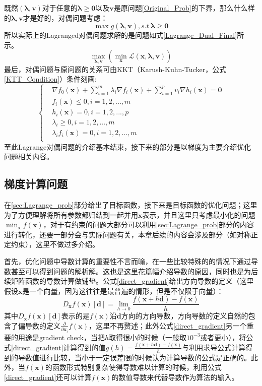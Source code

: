 既然$(\bm{\lambda},\bm{v})$对于任意的$\bm{\lambda} \geq \bm{0}$以及$\bm{v}$是原问题\ref{Original_Prob}的下界，那么什么样的$\bm{\lambda},\bm{v}$才是好的，对偶问题考虑：
\begin{equation}
\label{Dual_Prob}
\max g(\bm{\lambda},\bm{v}),s.t~\bm{\lambda} \geq \bm{0}
\end{equation}
所以实际上的Lagranged对偶问题求解的是问题如式\ref{Lagrange_Dual_Final}所示。
\begin{equation}
\label{Lagrange_Dual_Final}
\max_{\bm{\lambda},\bm{v}}\left(\min_{\bm{x}}\mathcal{L}(\bm{x},\bm{\lambda},\bm{v})\right)
\end{equation}
最后，对偶问题与原问题的关系可由KKT（Karush-Kuhn-Tucker，公式\ref{KTT_Condition}）条件刻画:
\begin{equation}
\label{KTT_Condition}
\left\{
\begin{aligned}
&\nabla f_0(\bm{x})+\sum_{i=1}^{m}\lambda_i \nabla f_i(\bm{x})+\sum_{i=1}^{p}v_i \nabla h_i(\bm{x})=\bm{0}\\
&f_i(\bm{x}) \leq 0,i=1,2,...,m\\
&h_i(\bm{x}) =0,i=1,2,...,p\\
&\lambda_i \geq 0,i=1,2,...,m\\
&\lambda_i f_i(\bm{x})=0, i=1,2,...,m\\
\end{aligned}
\right.
\end{equation}
至此Lagrange对偶问题的介绍基本结束，接下来的部分是以梯度为主要介绍优化问题相关内容。
\subsection{梯度计算问题}
\label{sec:gradinet}
在\ref{sec:Lagrange_prob}部分给出了目标函数，接下来是目标函数的优化问题；这里为了方便理解将所有参数都归结到一起并用$\bm{x}$表示，并且这里只考虑最小化的问题$\min_{\bm{x}} f(\bm{x})$，对于有约束的问题大部分可以利用\ref{sec:Lagrange_prob}部分的内容进行转化，还要一部分会与实际问题有关，本章后续的内容会涉及部分（如对称正定约束），这里不做过多介绍。

首先，优化问题中导数计算的重要性不言而喻，在一些比较特殊的的情况下通过导数甚至可以得到问题的解析解。这也是这里花篇幅介绍导数的原因，同时也是为后续矩阵函数的导数计算做铺垫。公式\ref{direct_gradient}给出方向导数的定义（这里假设$\bm{x}$是一个向量，因为这往往是最普遍的情形，但是不仅限于向量）：
\begin{equation}
\label{direct_gradient}
D_{\bm{x}}f(\bm{x})[\bm{d}]=\lim_{h\rightarrow 0}\frac{f(\bm{x}+h\bm{d})-f(\bm{x})}{h}
\end{equation}
其中$D_{\bm{x}}f(\bm{x})[\bm{d}]$表示的是$f(\bm{x})$沿$\bm{d}$方向的方向导数，方向导数的定义自然的包含了偏导数的定义$\frac{\partial}{\partial \bm{x}_{i}}f(\bm{x})$，这里不再赘述；此外公式\ref{direct_gradient}另一个重要的用途是gradient check，当把$h$取得很小的时候（一般取$10^{-3}$或者更小），将公式\ref{direct_gradient}计算得到的值$g(h)=\frac{f(\bm{x}+h\bm{d})-f(\bm{x})}{h}$与利用求导公式计算得到的导数值进行比较，当小于一定误差限的时候认为计算导数的公式是正确的。此外，当$f(\bm{x})$的函数形式特别复杂使得导数难以计算的时候，利用公式\ref{direct_gradient}还可以计算$f(\bm{x})$的数值导数来代替导数作为算法的输入。

